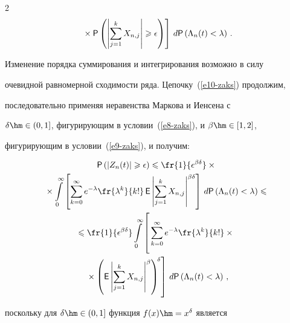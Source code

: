 \begin{multicols}{2}
\begin{multline}
\left.{}\times {\sf P}\left(\left\vert\sum\limits_{j=1}^kX_{n,j}\right\vert

\geqslant\epsilon\right)

\right]\,d{\sf P}\left(\Lambda_n(t)<\lambda\right)\,.\label{e10-zaks}

\end{multline}

Изменение порядка суммирования и интегрирования возможно в силу

очевидной равномерной сходимости ряда. Цепочку~(\ref{e10-zaks}) продолжим,

последовательно применяя неравенства Маркова и Иенсена с

$\delta\hm\in(0,1]$, фигурирующим в условии~(\ref{e8-zaks}), и $\beta\hm\in[1,2]$,

фигурирующим в условии~(\ref{e9-zaks}), и получим:

\begin{multline}

{\sf P}\left(|Z_n(t)|\geqslant\epsilon\right)\leqslant

\fr{1}{\epsilon^{\beta\delta}}\times{}\\

{}\times\int\limits_{0}^{\infty}\left[

\sum\limits_{k=0}^{\infty}e^{-\lambda}\fr{\lambda^k}{k!}\,{\sf

E}\left\vert \sum\limits_{j=1}^kX_{n,j}\right\vert^{\beta\delta}\right]\,

d{\sf P}\left(\Lambda_n(t)<\lambda\right) \leqslant{}

\\

\leqslant

\fr{1}{\epsilon^{\beta\delta}}\int\limits_{0}^{\infty}\left[

\vphantom{\left({\sf E}\left|\sum\limits_{j=1}^kX_{n,j}\right|^{\beta}\right)^{\delta}}

\sum\limits_{k=0}^{\infty}e^{-\lambda}\fr{\lambda^k}{k!}\times{}\right.\\

\left.{}\times

\left({\sf E}\left|\sum\limits_{j=1}^kX_{n,j}\right|^{\beta}\right)^{\!\delta}\right]\,d{\sf P}\left(\Lambda_n(t)<\lambda\right)\,,

\label{e11-zaks}

\end{multline}

поскольку для $\delta\hm\in(0,1]$ функция $f(x)\hm=x^{\delta}$ является


\end{multicols}
